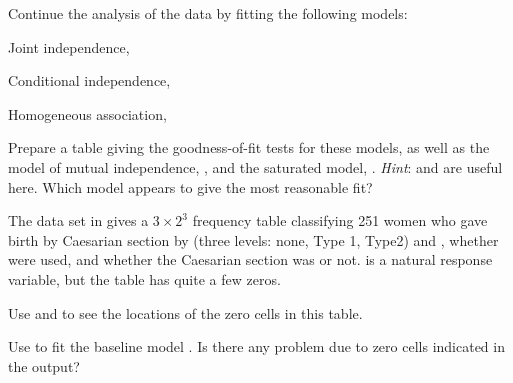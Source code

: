 \documentclass[10pt]{report}\usepackage[]{graphicx}\usepackage[]{color}
\begin{document}
\begin{Exercises}
  \exercise Continue the analysis of the  data by fitting the following models:
  \begin{enumerate*}
    \item Joint independence, 
    \begin{ans}
    \end{ans}
    
    \item Conditional independence, 
    \begin{ans}
    \end{ans}
    
    \item Homogeneous association, 
    \begin{ans}
    \end{ans}
    
    \item Prepare a table giving the goodness-of-fit tests for these models, as well as the
    model of mutual independence, , and the saturated model, .
    \emph{Hint}:  and  are useful here.
    Which model appears to give the most reasonable fit?
    \begin{ans}
    \end{ans}
    
  \end{enumerate*}

  \exercise\label{lab:caesar-loglin} The data set  in  gives a $3 \times 2^3$ 
  frequency table
  classifying 251 women who gave birth by Caesarian section by  (three levels: none, Type 1, Type2)
  and , whether  were used,  and whether the Caesarian section was 
  or not.  is a natural response variable, but the table has quite a few zeros.
  \begin{enumerate*}
    \item Use  and  to see the locations of the zero cells in this table.
    \begin{ans}
    \end{ans}
    
    \item Use  to fit the baseline model . Is there any problem due to 
    zero cells indicated in the output?
    \begin{ans}
    \end{ans}
    

\end{enumerate*}
\end{Exercises}
\end{document}
